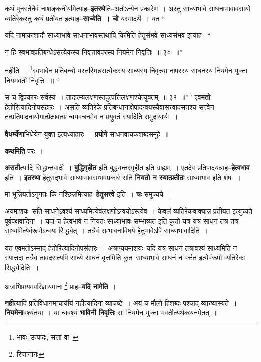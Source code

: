 \documentclass[article,12pt,a4paper]{memoir}
\begin{document}
	  \pstart कथं पुनस्तेनैवं नाशङ्कनीयमित्याह--\textbf{इतरथे}ति--अतोऽन्येन प्रकारेण । अस्तु साध्याभावे साधनाभावावसायो व्यतिरेकस्तु कथं प्रतीयत इत्याह--\textbf{साध्येति । चो} यस्मादर्थे । यत  \leavevmode{} “
	  
	यदि नामाकाशादौ साध्याभावे साधनाभावस्तथापि किमिति हेतुसंभवे साध्यसंभव इत्याह-- “
	  
	न हि स्वभावप्रतिबन्धेऽसत्येकस्य निवृत्तावपरस्य नियमेन निवृत्तिः ॥ ३० ॥” 
	  
	नहीति । \footnote{भावः--उत्पादः, सत्ता वा--\cite{dp-msD-n}}\-स्वभावेन प्रतिबन्धो यस्तस्मिन्नसत्येकस्य साध्यस्य निवृत्त्या नापरस्य साधनस्य नियमेन युक्ता नियमवती निवृत्तिः ॥ “
	  
	स च द्विप्रकारः सर्वस्य । तादात्म्यलक्षणस्तदुत्पत्तिलक्षणश्चेत्युक्तम् ॥ ३१ ॥”” एव\textbf{मतो} हेतोरित्यादिनोपसंहारः । असति व्यतिरेके प्रतिबन्धानाक्षेपादन्वयस्यैवासत्त्वादसतश्च सत्त्वेन तत्प्रतिपादनायोगात्प्रेक्षावतामन्वयवचनमेव न प्रयुक्तं स्यादिति समुदायार्थः ॥
	\pend
      

	  \pstart \textbf{वैधर्म्येणा}भिधेयेन युक्त इत्यध्याहारः । \textbf{प्रयोगे} साधनवाचकशब्दसमूहे ॥
	\pend
      

	  \pstart \textbf{कथमिति} परः ।
	\pend
      

	  \pstart \textbf{असती}त्यादि सिद्धान्तवादी । \textbf{बुद्धिगृहीत} इति बुद्ध्यन्तरगृहीत इति ग्राह्यम् । एतदेव प्रतिपादयन्नाह--\textbf{हेत्वभाव} इति । \textbf{इतरथा} हेतुसद्भावे साध्याभावसम्भवप्रकारे सति \textbf{नियतो न स्यात्प्रतीतः} साध्याभाव इति शेषः ।
	\pend
      

	  \pstart मा भून्नियतोऽनुगतः किं नश्छिन्नमित्याह--\textbf{हेतुसत्त्वे} इति । \textbf{चः} समुच्चये ।
	\pend
      

	  \pstart अयमाशयः--सति साधनेऽवश्यं साध्यमित्येवंलक्षणोऽन्वयोऽस्त्येव । केवलं व्यतिरेकवाक्यान्न प्रतीयत इत्युच्यते पूर्वपक्षवादिना । यदा च हेत्वभावे न नियतः साध्याभावः सम्भाव्यत इति कुतो यत्र यत्र साधनं तत्र तत्र साध्यमित्येवंरूपोऽन्वयः सिद्ध्येत् । तत्रैवं सम्भावनाविषये हेतुभावेऽपि साध्याभावादिति ।
	\pend
      

	  \pstart यत एवमतोऽस्माद् हेतोरित्यादिनोपसंहारः । अत्राप्ययमाशयः--यदि यत्र साधनं तत्रावश्यं साध्यमिति न स्यात्तदा तत्रैव तावदसत्यपि साध्ये साधनं वृत्तमिति कुतः साध्याभावे साधनं न वर्त्तत इत्येवंरूपो व्यतिरेकः सिद्ध्येदिति ॥
	\pend
      

	  \pstart अत्राभिप्रायमपरिज्ञायमानः \footnote{रिजानानः} प्राह--\textbf{यदि नामेति} ।
	\pend
      

	  \pstart \textbf{नही}त्यादि प्रतिविधानमाचार्यीयं नहीत्यादिना व्याचष्टे । अयं च मौलो हिशब्दः पश्चाद् व्याख्यास्यते । \textbf{नियमेना}वश्यंतया । या चावश्यं \textbf{भाविनी निवृत्तिः} सा नियमेन युक्ता भवतीत्यर्थकथनमेतत् ॥
	\pend
	  \bigskip
	  \begingroup
	
\end{document}
